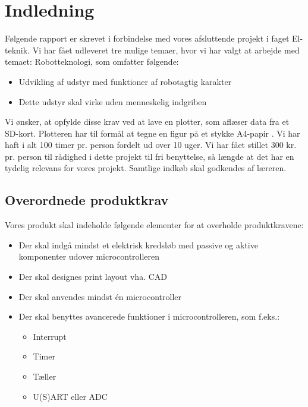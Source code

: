 \chapter{Indledning}


Følgende rapport er skrevet i forbindelse med vores afsluttende
projekt i faget El-teknik.  Vi har fået udleveret tre mulige temaer,
hvor vi har valgt at arbejde med temaet: Robotteknologi, som omfatter
følgende:

\begin{itemize}
\item Udvikling af udstyr med funktioner af robotagtig karakter
\item Dette udstyr skal virke uden menneskelig indgriben
\end{itemize}

Vi ønsker, at opfylde disse krav ved at lave en plotter, som aflæser
data fra et SD-kort. Plotteren har til formål at tegne en figur på et
stykke A4-papir . Vi
har haft i alt 100 timer pr. person fordelt ud over 10 uger. Vi har
fået stillet 300 kr. pr. person til rådighed i dette projekt til fri
benyttelse, så længde at det har en tydelig relevans for vores
projekt. Samtlige indkøb skal godkendes af læreren.


\section{Overordnede produktkrav}

Vores produkt skal indeholde følgende elementer for at overholde
produktkravene:

\begin{itemize}
\item Der skal indgå mindst et elektrisk kredsløb med passive og
  aktive komponenter udover microcontrolleren
\item Der skal designes print layout vha. CAD
\item Der skal anvendes mindst én microcontroller
\item Der skal benyttes avancerede funktioner i microcontrolleren, som f.eks.:
  \begin{itemize}
  \item Interrupt
  \item Timer
  \item Tæller
  \item U(S)ART eller ADC
  \end{itemize}
\end{itemize}


